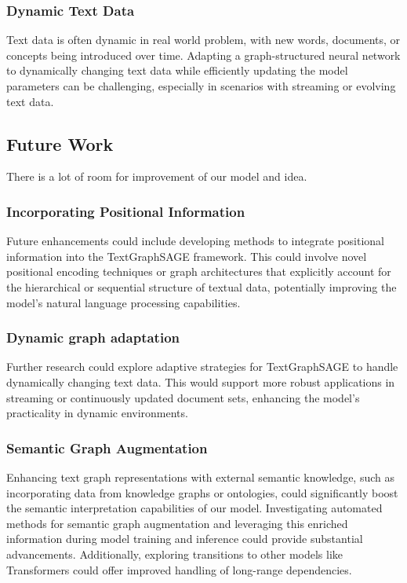 \documentclass{article}
\begin{document}
\subsubsection{Dynamic Text Data}
Text data is often dynamic in real world problem, with new words, documents, or concepts being introduced over time. Adapting a graph-structured neural network to dynamically changing text data while efficiently updating the model parameters can be challenging, especially in scenarios with streaming or evolving text data.

\subsection{Future Work}
There is a lot of room for improvement of our model and idea.
\subsubsection{Incorporating Positional Information}
Future enhancements could include developing methods to integrate positional information into the TextGraphSAGE framework. This could involve novel positional encoding techniques or graph architectures that explicitly account for the hierarchical or sequential structure of textual data, potentially improving the model's natural language processing capabilities.

\subsubsection{Dynamic graph adaptation}
Further research could explore adaptive strategies for TextGraphSAGE to handle dynamically changing text data. This would support more robust applications in streaming or continuously updated document sets, enhancing the model’s practicality in dynamic environments.

\subsubsection{Semantic Graph Augmentation}
Enhancing text graph representations with external semantic knowledge, such as incorporating data from knowledge graphs or ontologies, could significantly boost the semantic interpretation capabilities of our model. Investigating automated methods for semantic graph augmentation and leveraging this enriched information during model training and inference could provide substantial advancements. Additionally, exploring transitions to other models like Transformers could offer improved handling of long-range dependencies.


\newpage
\small

\newpage



\end{document}
